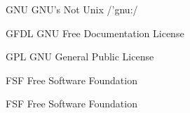 \begin{denotation}
\item[GNU] GNU's Not Unix /'gnu:/
\item[GFDL] GNU Free Documentation License
\item[GPL] GNU General Public License
\item[FSF] Free Software Foundation
\item[FSF] Free Software Foundation
\end{denotation}

